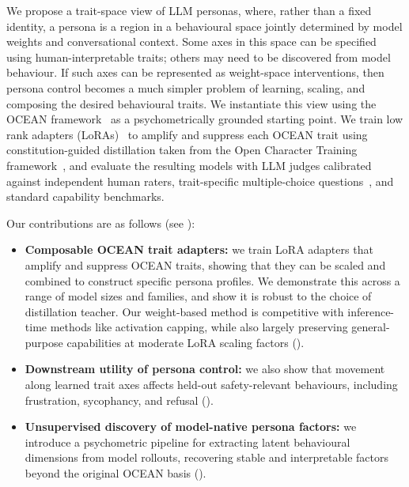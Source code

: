 We propose a trait-space view of LLM personas, where, rather than a fixed identity, a persona is a region in a behavioural space jointly determined by model weights and conversational context. Some axes in this space can be specified using human-interpretable traits; others may need to be discovered from model behaviour. If such axes can be represented as weight-space interventions, then persona control becomes a much simpler problem of learning, scaling, and composing the desired behavioural traits. We instantiate this view using the OCEAN framework~\citep{mccrae1992introduction} as a psychometrically grounded starting point. We train low rank adapters (LoRAs)~\citep{hu2021lora} to amplify and suppress each OCEAN trait using constitution-guided distillation taken from the Open Character Training framework~\citep{maiya2025opencharacter}, and evaluate the resulting models with LLM judges calibrated against independent human raters, trait-specific multiple-choice questions~\citep{lee2024trait}, and standard capability benchmarks. 

Our contributions are as follows (see ):

\begin{itemize}[nosep]
  \item \textbf{Composable OCEAN trait adapters:} we train LoRA adapters that amplify and suppress OCEAN traits, showing that they can be scaled and combined to construct specific persona profiles. We demonstrate this across a range of model sizes and families, and show it is robust to the choice of distillation teacher. Our weight-based method is competitive with inference-time methods like activation capping, while also largely preserving general-purpose capabilities at moderate LoRA scaling factors (). 
  \item \textbf{Downstream utility of persona control:} we also show that movement along learned trait axes affects held-out safety-relevant behaviours, including frustration, sycophancy, and refusal ().
  \item \textbf{Unsupervised discovery of model-native persona factors:} we introduce a psychometric pipeline for extracting latent behavioural dimensions from model rollouts, recovering stable and interpretable factors beyond the original OCEAN basis ().
\end{itemize}


